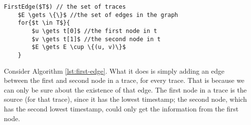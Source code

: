 \begin{lstlisting}[caption={The first-edge algorithm},label={lst:first-edge}]
FirstEdge($T$) // the set of traces
	$E \gets \{\}$ //the set of edges in the graph
	for{$t \in T$}{
		$u \gets t[0]$ //the first node in t
		$v \gets t[1]$ //the second node in t
		$E \gets E \cup \{(u, v)\}$
	}
\end{lstlisting}

 Consider Algorithm \ref{lst:first-edge}. What it does is simply adding an edge between the first and second node in a trace, for every trace. That is because we can only be sure about the existence of that edge. The first node in a trace is the source (for that trace), since it has the lowest timestamp; the second node, which has the second lowest timestamp, could only get the information from the first node.
 
